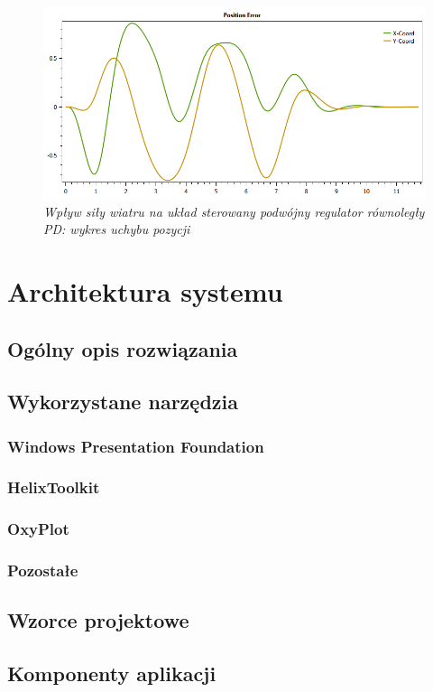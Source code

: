\documentclass[12pt, oneside]{report}
\theoremstyle{definition}
\begin{document}
\begin{figure}[H]
	\centering
		\includegraphics[width = 320pt]{WindPDCEP} 
		\caption{\textit{Wpływ siły wiatru na układ sterowany podwójny regulator równoległy PD: wykres uchybu pozycji}}
		\label{plot:WindPDCEP}
\end{figure}


\chapter{Architektura systemu}
\section{Ogólny opis rozwiązania}
\section{Wykorzystane narzędzia}
\subsection{Windows Presentation Foundation}
\subsection{HelixToolkit}
\subsection{OxyPlot}
\subsection{Pozostałe}
\section{Wzorce projektowe}
\section{Komponenty aplikacji}
\end{document}
